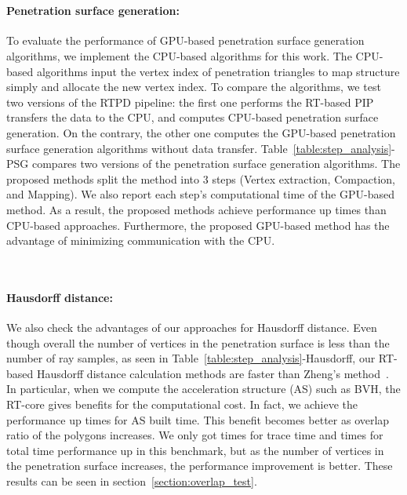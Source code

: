 {~\\

\paragraph{Penetration surface generation:}
To evaluate the performance of GPU-based penetration surface generation algorithms, we implement the CPU-based algorithms for this work. The CPU-based algorithms input the vertex index of penetration triangles to map structure simply and allocate the new vertex index. To compare the algorithms, we test two versions of the RTPD pipeline: the first one performs the RT-based PIP transfers the data to the CPU, and computes CPU-based penetration surface generation. On the contrary, the other one computes the GPU-based penetration surface generation algorithms without data transfer. 
Table~\ref{table:step_analysis}-PSG compares two versions of the penetration surface generation algorithms.
The proposed methods split the method into 3 steps (Vertex extraction, Compaction, and Mapping).
We also report each step's computational time of the GPU-based method.
As a result, the proposed methods achieve performance up  times than CPU-based approaches.
Furthermore, the proposed GPU-based method has the advantage of minimizing communication with the CPU.

~\\
\paragraph{Hausdorff distance:} We also check the advantages of our approaches for Hausdorff distance.
Even though overall the number of vertices in the penetration surface is less than the number of ray samples, as seen in Table~\ref{table:step_analysis}-Hausdorff, our RT-based Hausdorff distance calculation methods are faster than Zheng's method~\cite{zheng2022economic}. In particular, when we compute the acceleration structure (AS) such as BVH, the RT-core gives benefits for the computational cost. In fact, we achieve the performance up  times for AS built time. This benefit becomes better as overlap ratio of the polygons increases. We only got  times for trace time and  times for total time performance up in this benchmark, but as the number of vertices in the penetration surface increases, the performance improvement is better. These results can be seen in section~\ref{section:overlap_test}.
~\\
} %


